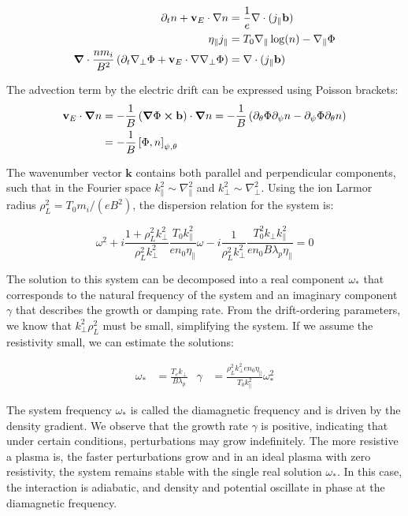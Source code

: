 \begin{align}
	\partial_t n + \mathbf{v}_E \cdot \nabla n &= \frac{1}{e} \nabla \cdot (j_\parallel \mathbf{b}) \\
	\eta_\parallel j_\parallel &= T_0 \nabla_\parallel \log(n) - \nabla_\parallel \Phi \\
	\grad\cdot\frac{nm_i}{B^2} \left(\partial_t \nabla_\perp \Phi + \mathbf{v}_E \cdot \nabla \nabla_\perp \Phi\right) &= \nabla \cdot (j_\parallel \mathbf{b})
\end{align}

The advection term by the electric drift can be expressed using Poisson brackets:
\begin{align}
	\mathbf{v}_E\cdot\grad n &= -\frac{1}{B}\left(\grad\Phi\cross \mathbf{b} \right)\cdot\grad n = -\frac{1}{B} \left(\partial_\theta\Phi \partial_\psi n - \partial_\psi\Phi \partial_\theta n\right) \nonumber \\ 
	&= -\frac{1}{B}\left[\Phi,n\right]_{\psi,\theta} \label{eq:edge_poissonBracket}
\end{align}

The wavenumber vector $ \mathbf{k} $ contains both parallel and perpendicular components, such that in the Fourier space $ k_\parallel^2 \sim \nabla_\parallel^2 $ and $ k_\perp^2 \sim \nabla_\perp^2 $. Using the ion Larmor radius $\rho_L^2 = T_0m_i/(eB^2)$, the dispersion relation for the system is: 

\begin{equation}
	\omega^2 + i\frac{1 + \rho_L^2k_\perp^2}{\rho_L^2k_\perp^2}\frac{T_0k_\parallel^2}{en_0\eta_\parallel}\omega - i\frac{1}{\rho_L^2k_\perp^2}\frac{T_0^2k_\perp k_\parallel^2}{en_0B\lambda_p\eta_\parallel} = 0
\end{equation}


The solution to this system can be decomposed into a real component $ \omega_* $ that corresponds to the natural frequency of the system and an imaginary component $ \gamma $ that describes the growth or damping rate. From the drift-ordering parameters, we know that $ k_\perp^2 \rho_L^2 $ must be small, simplifying the system. If we assume the resistivity small, we can estimate the solutions:

\begin{align}
	\omega_* &= \frac{T_e k_\perp}{B\lambda_p} & \gamma &= \frac{\rho_L^2k_\perp^2en_0\eta_\parallel}{T_0k_\parallel^2}\omega_*^2
\end{align}

The system frequency $ \omega_* $ is called the diamagnetic frequency and is driven by the density gradient. We observe that the growth rate $ \gamma $ is positive, indicating that under certain conditions, perturbations may grow indefinitely. The more resistive a plasma is, the faster perturbations grow and in an ideal plasma with zero resistivity, the system remains stable with the single real solution $\omega_*$. In this case, the interaction is adiabatic, and density and potential oscillate in phase at the diamagnetic frequency.


